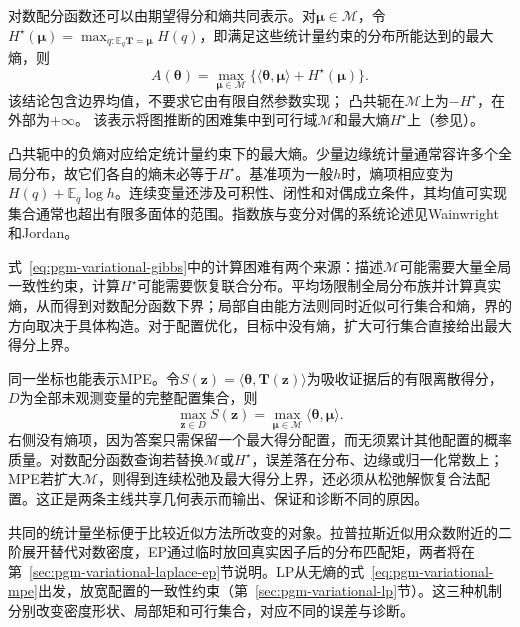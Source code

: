 对数配分函数还可以由期望得分和熵共同表示。对$\bm\mu\in\mathcal M$，令$H^\star(\bm\mu)=\max_{q:\mathbb E_q\bm T=\bm\mu}H(q)$，即满足这些统计量约束的分布所能达到的最大熵，则
\begin{equation}
  A(\bm\theta)=\max_{\bm\mu\in\mathcal M}
    \{\langle\bm\theta,\bm\mu\rangle+H^\star(\bm\mu)\}.
  \label{eq:pgm-variational-gibbs}
\end{equation}
该结论包含边界均值，不要求它由有限自然参数实现；
凸共轭在$\mathcal M$上为$-H^\star$，在外部为$+\infty$。
该表示将图推断的困难集中到可行域$\mathcal M$和最大熵$H^\star$上（参见）。

凸共轭中的负熵对应给定统计量约束下的最大熵。少量边缘统计量通常容许多个全局分布，故它们各自的熵未必等于$H^\star$。基准项为一般$h$时，熵项相应变为$H(q)+\mathbb E_q\log h$。连续变量还涉及可积性、闭性和对偶成立条件，其均值可实现集合通常也超出有限多面体的范围。指数族与变分对偶的系统论述见Wainwright和Jordan。

式~\eqref{eq:pgm-variational-gibbs}中的计算困难有两个来源：描述$\mathcal M$可能需要大量全局一致性约束，计算$H^\star$可能需要恢复联合分布。平均场限制全局分布族并计算真实熵，从而得到对数配分函数下界；局部自由能方法则同时近似可行集合和熵，界的方向取决于具体构造。对于配置优化，目标中没有熵，扩大可行集合直接给出最大得分上界。

同一坐标也能表示MPE。令$S(\bm z)=\langle\bm{\theta},\bm T(\bm z)\rangle$为吸收证据后的有限离散得分，$D$为全部未观测变量的完整配置集合，则
\begin{equation}
  \max_{\bm z\in D}S(\bm z)
    =\max_{\bm{\mu}\in\mathcal M}
       \langle\bm{\theta},\bm{\mu}\rangle.
  \label{eq:pgm-variational-mpe}
\end{equation}
右侧没有熵项，因为答案只需保留一个最大得分配置，而无须累计其他配置的概率质量。对数配分函数查询若替换$\mathcal M$或$H^\star$，误差落在分布、边缘或归一化常数上；MPE若扩大$\mathcal M$，则得到连续松弛及最大得分上界，还必须从松弛解恢复合法配置。这正是两条主线共享几何表示而输出、保证和诊断不同的原因。

共同的统计量坐标便于比较近似方法所改变的对象。拉普拉斯近似用众数附近的二阶展开替代对数密度，EP通过临时放回真实因子后的分布匹配矩，两者将在第~\ref{sec:pgm-variational-laplace-ep}节说明。LP从无熵的式~\eqref{eq:pgm-variational-mpe}出发，放宽配置的一致性约束（第~\ref{sec:pgm-variational-lp}节）。这三种机制分别改变密度形状、局部矩和可行集合，对应不同的误差与诊断。

